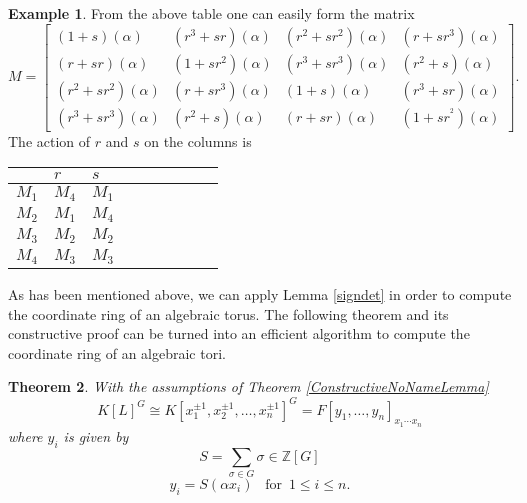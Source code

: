 \documentclass{article}
\theoremstyle{plain}
\newtheorem{theorem}{Theorem}
\theoremstyle{definition}
\newtheorem{example}[theorem]{Example}
\newcommand{\Z}{\ensuremath{\mathbb{Z}}}
\begin{document}
\begin{example}
\noindent
From the above table one can easily form the matrix 
$$
M= \begin{bmatrix}
(1+s)(\alpha) & (r^3+sr)(\alpha) & (r^2+sr^2)(\alpha) & (r+sr^3)(\alpha)\\
(r+sr)(\alpha) & (1+sr^2)(\alpha) & (r^3+sr^3)(\alpha) & (r^2+s)(\alpha)\\
(r^2+sr^2)(\alpha) & (r+sr^3)(\alpha) & (1+s)(\alpha) & (r^3+sr)(\alpha)\\
(r^3+sr^3)(\alpha) & (r^2+s)(\alpha) & (r+sr)(\alpha) & (1+sr^^2)(\alpha)
\end{bmatrix}.
$$
The action of $r$ and $s$ on the columns is
\begin{table}[H]
\centering
\begin{tabular}{l|llllllll} 
 & $r$ & $s$ \\
 \hline
 $M_1$  & $M_4$ & $M_1$ \\
$M_2$ & $M_1$ & $M_4$ \\
$M_3$ & $M_2$ & $M_2$ \\
$M_4$ & $M_3$ & $M_3$ \\
\end{tabular}
\end{table}

\end{example} 
\noindent
As has been mentioned above, we can apply Lemma \ref{signdet} in order to compute the coordinate ring of an algebraic torus. The following theorem and its constructive proof can be turned into an efficient algorithm to compute the coordinate ring of an algebraic tori.
\begin{theorem}
With the assumptions of Theorem \ref{ConstructiveNoNameLemma} $$K[L]^G \cong K[x^{\pm 1}_1, x^{\pm 1}_2, \ldots , x^{\pm 1}_n]^G = F[y_1, \ldots , y_n]_{x_1\cdots x_n}$$ where $ y_i$ is given by $$S = \sum_{\sigma \in G} \sigma \in \Z[G]$$
$$y_i = S(\alpha x_i)  \,\,\,\,\, \text{for} \,\,\, 1\leq i \leq n.$$
\end{theorem}
\end{document}
